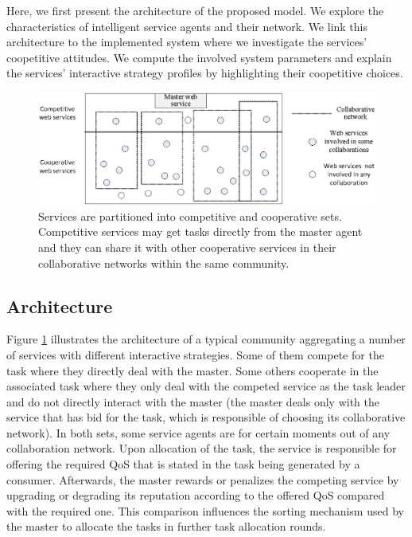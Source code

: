 Here, we first present the architecture of the proposed
model. We explore the characteristics of intelligent service
agents and their network. We link this architecture to the
implemented system where we investigate the services' coopetitive
attitudes. We compute the involved system parameters and explain
the services' interactive strategy profiles by highlighting their
coopetitive choices.

\begin{figure}[h]
\centering
\includegraphics[scale=1]{Figures/architecture++.eps}
\caption{Services are partitioned into competitive and cooperative
sets. Competitive services may get tasks directly from the master
agent and they can share it with other cooperative services in
their collaborative networks within the same community.}
\label{architectureFigure}
\end{figure}

\subsection{Architecture}

Figure \ref{architectureFigure} illustrates the architecture of a
typical community aggregating a number of services with different
interactive strategies. Some of them compete for the task where
they directly deal with the master. Some others cooperate in the
associated task where they only deal with the competed service as
the task leader and do not directly interact with the master (the
master deals only with the service that has bid for the task,
which is responsible of choosing its collaborative network). In
both sets, some service agents are for certain moments out of any
collaboration network. Upon allocation of
the task, the service is responsible for offering the required QoS
that is stated in the task being generated by a consumer.
Afterwards,  the master rewards or penalizes the competing
service by upgrading or degrading its reputation according to the
offered QoS compared with the required one. This comparison
influences the sorting mechanism used by the master to allocate
the tasks in further task allocation rounds.



